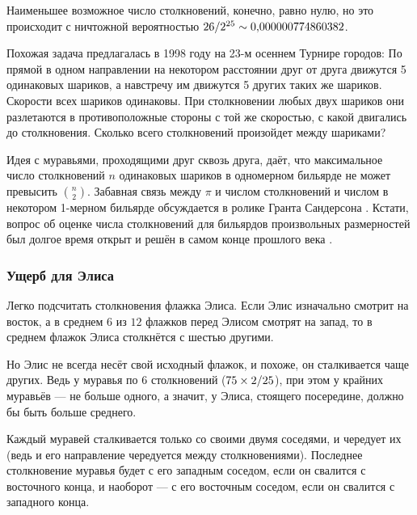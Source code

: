 {\sloppy 

Наименьшее возможное число столкновений, конечно, равно нулю, но это происходит с ничтожной вероятностью $26/2^{25} \z\sim 0{,}000000774860382$.

}

\begin{addedbytheeditors}
Похожая задача предлагалась в 1998 году на 23-м осеннем Турнире городов:
По прямой в одном направлении на некотором расстоянии друг от друга движутся 5 одинаковых шариков, а навстречу им движутся 5 других таких же шариков.
Скорости всех шариков одинаковы.
При столкновении любых двух шариков они разлетаются в противоположные стороны с той же скоростью, с какой двигались до столкновения.
Сколько всего столкновений произойдет между шариками?

Идея с муравьями, проходящими друг сквозь друга, даёт, что максимальное число столкновений $n$ одинаковых шариков в одномерном бильярде не может превысить $\binom n2$.
Забавная связь между $\pi$ и числом столкновений и числом в некотором 1-мерном бильярде обсуждается в ролике Гранта Сандерсона \cite{1D-billiard}.
Кстати, вопрос об оценке числа столкновений для бильярдов произвольных размерностей был долгое время открыт и решён в самом конце прошлого века \cite{burago-ferleger-kononenko}. \pr

\end{addedbytheeditors}

\subsubsection*{Ущерб для Элиса}

Легко подсчитать столкновения флажка Элиса.
Если Элис изначально смотрит на восток, а в среднем $6$ из $12$ флажков перед Элисом смотрят на запад, то  в среднем  флажок Элиса столкнётся с шестью другими.

Но Элис не всегда несёт свой исходный флажок, и похоже, он сталкивается чаще других.
Ведь у муравья по 6 столкновений ($75 \z\times 2/25$), при этом у крайних муравьёв --- не больше одного, а значит, у Элиса, стоящего посередине, должно бы быть больше среднего.

Каждый муравей сталкивается только со своими двумя соседями,
и чередует их (ведь и его направление чередуется между столкновениями).
Последнее столкновение муравья будет с его западным соседом, если он свалится с восточного конца, и наоборот --- с его восточным соседом, если он свалится с западного конца.

